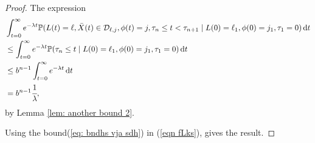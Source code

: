 \begin{proof}
	The expression 
	\begin{align}
		&\int_{t=0}^\infty e^{-\lambda t} \mathbb P(L(t) = \ell, \bar X(t)\in\mathcal D_{\ell,j}, \phi(t) = j, \tau_{n}\leq t<\tau_{n+1} \nonumber
		\mid L(0)=\ell_1,\phi(0)=j_1, \tau_1=0) \, \mathrm{d} t
		\\&\leq \int_{t=0}^\infty e^{-\lambda t} \mathbb P(\tau_{n}\leq t \nonumber
		\mid L(0)=\ell_1,\phi(0)=j_1, \tau_1=0) \, \mathrm{d} t
		\\&\leq b^{n-1}\int_{t=0}^\infty e^{-\lambda t} \, \mathrm{d} t \nonumber 
		\\&=b^{n-1}\cfrac{1}{\lambda}, \label{eq: bndhs vja sdh}
	\end{align}
	by Lemma \ref{lem: another bound 2}.
	
	Using the bound(\ref{eq: bndhs vja sdh}) in (\ref{eqn fLks}), gives the result. %
\end{proof}

